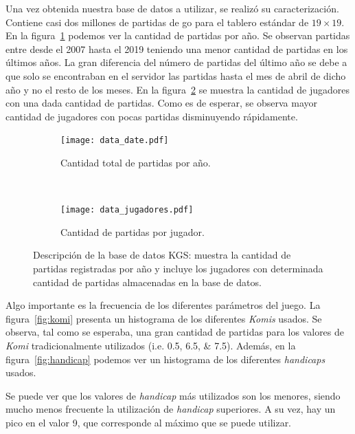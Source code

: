 \documentclass[11pt,twoside,spanish]{report} %
\begin{document}
Una vez obtenida nuestra base de datos a utilizar, se realiz\'o su caracterizaci\'on.
Contiene casi dos millones de partidas de go para el tablero est\'andar de $19\times19$.
En la figura~\ref{fig:data} podemos ver la cantidad de partidas por a\~no.
Se observan partidas entre desde el 2007 hasta el 2019 teniendo una menor cantidad de partidas en los \'ultimos a\~nos.
La gran diferencia del n\'umero de partidas del \'ultimo a\~no se debe a que solo se encontraban en el servidor las partidas hasta el mes de abril de dicho a\~no y no el resto de los meses.
En la figura~\ref{fig:jugadores} se muestra la cantidad de jugadores con una dada cantidad de partidas.
Como es de esperar, se observa mayor cantidad de jugadores con pocas partidas disminuyendo r\'apidamente.

\begin{figure}[H]
	\centering
	\begin{subfigure}[t]{.49\textwidth}
		\centering
		\texttt{[image: data\_date.pdf]}
		\caption{Cantidad total de partidas por a\~no.}
		\label{fig:data}
	\end{subfigure}
	~
	\begin{subfigure}[t]{.49\textwidth}
		\centering
		\texttt{[image: data\_jugadores.pdf]}
		\caption{Cantidad de partidas por jugador.}
		\label{fig:jugadores}
	\end{subfigure}
	\caption{Descripci\'on de la base de datos KGS:  muestra la cantidad de partidas registradas por a\~no y  incluye los jugadores con determinada cantidad de partidas almacenadas en la base de datos. }
	\label{fig:dataJugadores}
\end{figure}



Algo importante es la frecuencia de los diferentes par\'ametros del juego.
La figura~\ref{fig:komi} presenta un histograma de los diferentes \textit{Komis} usados.
Se observa, tal como se esperaba, una gran cantidad de partidas para los valores de \textit{Komi} tradicionalmente utilizados (i.e. \numlist{0.5;6.5;7.5}).
Adem\'as, en la figura~\ref{fig:handicap} podemos ver un histograma de los diferentes \textit{handicaps} usados.

Se puede ver que los valores de \emph{handicap} m\'as utilizados son los menores, siendo mucho menos frecuente la utilizaci\'on de \emph{handicap} superiores.
A su vez, hay un pico en el valor 9, que corresponde al m\'aximo que se puede utilizar.
\end{document}
